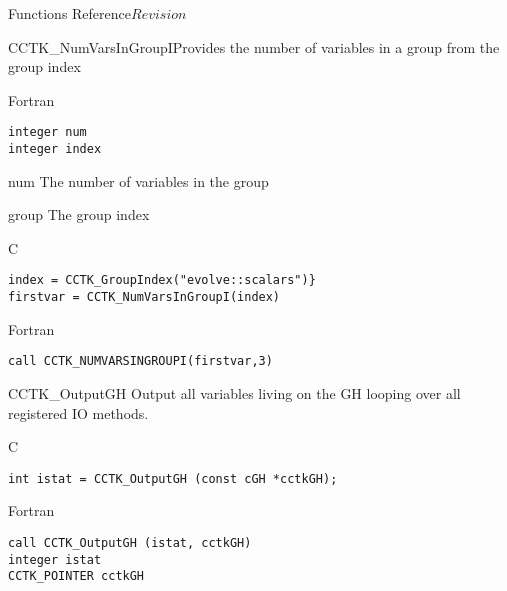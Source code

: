 \begin{cactuspart}{ Functions Reference}{}{$Revision$}
\begin{FunctionDescription}{CCTK\_NumVarsInGroupI}{Provides the number of variables in a group from the group index}
\begin{SynopsisSection}
\begin{Synopsis}{Fortran}
\begin{verbatim}
integer num
integer index\end{verbatim}
\end{Synopsis}
\end{SynopsisSection}
\begin{ParameterSection}
\begin{Parameter}{num}
The number of variables in the group
\end{Parameter}
\begin{Parameter}{group}
The group index
\end{Parameter}
\end{ParameterSection}
\begin{Discussion}

\end{Discussion}
\begin{ExampleSection}
\begin{Example}{C}
\begin{verbatim}
index = CCTK_GroupIndex("evolve::scalars")}
firstvar = CCTK_NumVarsInGroupI(index)
\end{verbatim}
\end{Example}
\begin{Example}{Fortran}
\begin{verbatim}
call CCTK_NUMVARSINGROUPI(firstvar,3)
\end{verbatim}
\end{Example}
\end{ExampleSection}
\end{FunctionDescription}








\begin{FunctionDescription}{CCTK\_OutputGH}
\label{CCTK-OutputGH}
Output all variables living on the GH looping over all registered IO methods.

\begin{SynopsisSection}
\begin{Synopsis}{C}
\begin{verbatim}
int istat = CCTK_OutputGH (const cGH *cctkGH);
\end{verbatim}
\end{Synopsis}
\begin{Synopsis}{Fortran}
\begin{verbatim}
call CCTK_OutputGH (istat, cctkGH)
integer istat
CCTK_POINTER cctkGH
\end{verbatim}
\end{Synopsis}
\end{SynopsisSection}


\end{FunctionDescription}
\end{cactuspart}

